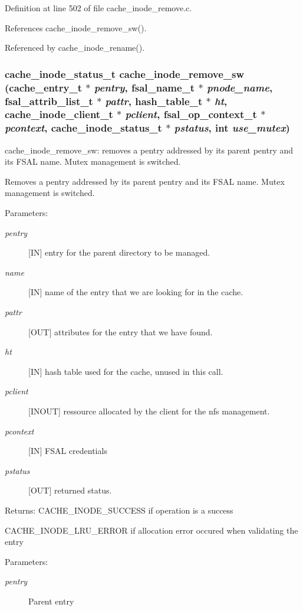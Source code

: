 Definition at line 502 of file cache\_\-inode\_\-remove.c.

References cache\_\-inode\_\-remove\_\-sw().

Referenced by cache\_\-inode\_\-rename().
\subsubsection{\setlength{\rightskip}{0pt plus 5cm}cache\_\-inode\_\-status\_\-t cache\_\-inode\_\-remove\_\-sw (cache\_\-entry\_\-t $\ast$ {\em pentry}, fsal\_\-name\_\-t $\ast$ {\em pnode\_\-name}, fsal\_\-attrib\_\-list\_\-t $\ast$ {\em pattr}, hash\_\-table\_\-t $\ast$ {\em ht}, cache\_\-inode\_\-client\_\-t $\ast$ {\em pclient}, fsal\_\-op\_\-context\_\-t $\ast$ {\em pcontext}, cache\_\-inode\_\-status\_\-t $\ast$ {\em pstatus}, int {\em use\_\-mutex})}\label{cache__inode__remove_8c_a2}


cache\_\-inode\_\-remove\_\-sw: removes a pentry addressed by its parent pentry and its FSAL name. Mutex management is switched.

Removes a pentry addressed by its parent pentry and its FSAL name. Mutex management is switched.

\begin{Desc}
\item[Parameters:]
\begin{description}
\item[{\em pentry}][IN] entry for the parent directory to be managed. \item[{\em name}][IN] name of the entry that we are looking for in the cache. \item[{\em pattr}][OUT] attributes for the entry that we have found. \item[{\em ht}][IN] hash table used for the cache, unused in this call. \item[{\em pclient}][INOUT] ressource allocated by the client for the nfs management. \item[{\em pcontext}][IN] FSAL credentials \item[{\em pstatus}][OUT] returned status.\end{description}
\end{Desc}
\begin{Desc}
\item[Returns:]CACHE\_\-INODE\_\-SUCCESS if operation is a success \par
 

CACHE\_\-INODE\_\-LRU\_\-ERROR if allocation error occured when validating the entry \end{Desc}
\begin{Desc}
\item[Parameters: ]\par
\begin{description}
\item[{\em 
pentry}]Parent entry \end{description}
\end{Desc}


